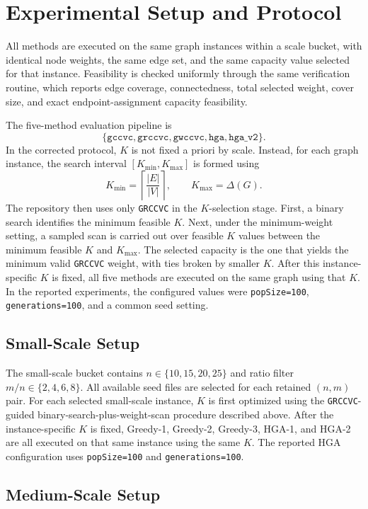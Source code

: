 \documentclass[11pt]{article}
\begin{document}
\section{Experimental Setup and Protocol}

All methods are executed on the same graph instances within a scale bucket, with identical node weights, the same edge set, and the same capacity value selected for that instance. Feasibility is checked uniformly through the same verification routine, which reports edge coverage, connectedness, total selected weight, cover size, and exact endpoint-assignment capacity feasibility.

The five-method evaluation pipeline is
\[
\{\texttt{gccvc},\texttt{grccvc},\texttt{gwccvc},\texttt{hga},\texttt{hga\_v2}\}.
\]
In the corrected protocol, \(K\) is not fixed a priori by scale. Instead, for each graph instance, the search interval \([K_{\min},K_{\max}]\) is formed using
\[
K_{\min}=\left\lceil \frac{|E|}{|V|}\right\rceil,\qquad K_{\max}=\Delta(G).
\]
The repository then uses only \texttt{GRCCVC} in the \(K\)-selection stage. First, a binary search identifies the minimum feasible \(K\). Next, under the minimum-weight setting, a sampled scan is carried out over feasible \(K\) values between the minimum feasible \(K\) and \(K_{\max}\). The selected capacity is the one that yields the minimum valid \texttt{GRCCVC} weight, with ties broken by smaller \(K\). After this instance-specific \(K\) is fixed, all five methods are executed on the same graph using that \(K\). In the reported experiments, the configured values were \texttt{popSize=100}, \texttt{generations=100}, and a common seed setting.

\subsection{Small-Scale Setup}

The small-scale bucket contains \(n\in\{10,15,20,25\}\) and ratio filter \(m/n\in\{2,4,6,8\}\). All available seed files are selected for each retained \((n,m)\) pair. For each selected small-scale instance, \(K\) is first optimized using the \texttt{GRCCVC}-guided binary-search-plus-weight-scan procedure described above. After the instance-specific \(K\) is fixed, Greedy-1, Greedy-2, Greedy-3, HGA-1, and HGA-2 are all executed on that same instance using the same \(K\). The reported HGA configuration uses \texttt{popSize=100} and \texttt{generations=100}.

\subsection{Medium-Scale Setup}
\end{document}
